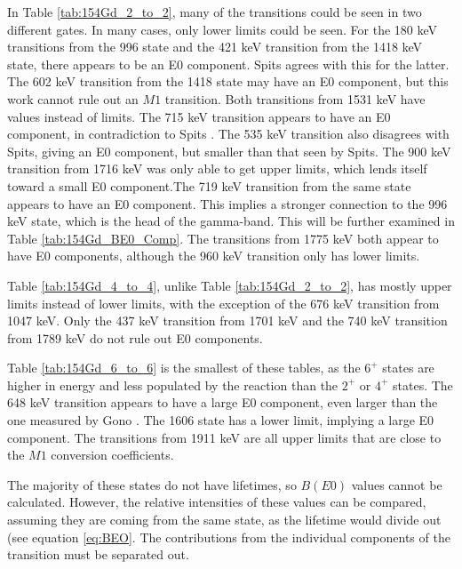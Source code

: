 \afterpage{\clearpage}

In Table \ref{tab:154Gd_2_to_2}, many of the transitions could be seen in two different gates. In many cases, only lower limits could be seen. For the 180 keV transitions from the 996 state and the 421 keV transition from the 1418 keV state, there appears to be an E0 component. Spits \cite{spits96:_154gd} agrees with this for the latter. The 602 keV transition from the 1418 state may have an E0 component, but this work cannot rule out an $M1$ transition. Both transitions from 1531 keV have values instead of limits. The 715 keV transition appears to have an E0 component, in contradiction to Spits \cite{spits96:_154gd}. The 535 keV transition also disagrees with Spits, giving an E0 component, but smaller than that seen by Spits. The 900 keV transition from 1716 keV was only able to get upper limits, which lends itself toward a small E0 component.The 719 keV transition from the same state appears to have an E0 component. This implies a stronger connection to the 996 keV state, which is the head of the gamma-band. This will be further examined in Table \ref{tab:154Gd_BE0_Comp}. The transitions from 1775 keV both appear to have E0 components, although the 960 keV transition only has lower limits.

\afterpage{\clearpage}

Table \ref{tab:154Gd_4_to_4}, unlike Table \ref{tab:154Gd_2_to_2}, has mostly upper limits instead of lower limits, with the exception of the 676 keV transition from 1047 keV. Only the 437 keV transition from 1701 keV and the 740 keV transition from 1789 keV do not rule out E0 components.

\afterpage{\clearpage}

Table \ref{tab:154Gd_6_to_6} is the smallest of these tables, as the $6^+$ states are higher in energy and less populated by the reaction than the $2^+$ or $4^+$ states. The 648 keV transition appears to have a large E0 component, even larger than the one measured by Gono \cite{gono74:_154gd_e0}. The 1606 state has a lower limit, implying a large E0 component. The transitions from 1911 keV are all upper limits that are close to the $M1$ conversion coefficients.   

The majority of these states do not have lifetimes, so $B(E0)$ values cannot be calculated. However, the relative intensities of these values can be compared, assuming they are coming from the same state, as the lifetime would divide out (see equation \ref{eq:BEO}. The contributions from the individual components of the transition must be separated out.


